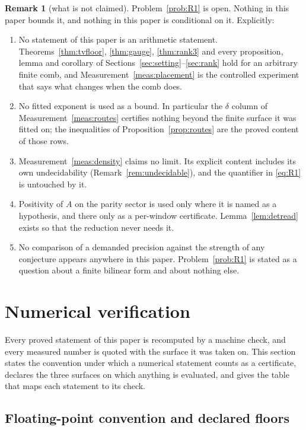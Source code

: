 \documentclass[11pt,a4paper]{article}
\theoremstyle{plain}
\theoremstyle{definition}
\newtheorem{remark}[theorem]{Remark}
\begin{document}
\begin{remark}[what is not claimed]
\label{rem:notclaimed}
Problem~\ref{prob:R1} is open. Nothing in this paper bounds it, and nothing in
this paper is conditional on it. Explicitly:
\begin{enumerate}[label=\textup{(\roman*)},leftmargin=2.6em]
\item No statement of this paper is an arithmetic statement.
  Theorems~\ref{thm:tvfloor}, \ref{thm:gauge}, \ref{thm:rank3} and every
  proposition, lemma and corollary of
  Sections~\ref{sec:setting}--\ref{sec:rank} hold for an arbitrary finite comb,
  and Measurement~\ref{meas:placement} is the controlled experiment that says
  what changes when the comb does.
\item No fitted exponent is used as a bound. In particular the $\delta$ column
  of Measurement~\ref{meas:routes} certifies nothing beyond the finite surface
  it was fitted on; the inequalities of Proposition~\ref{prop:routes} are the
  proved content of those rows.
\item Measurement~\ref{meas:density} claims no limit. Its explicit content
  includes its own undecidability (Remark~\ref{rem:undecidable}), and the
  quantifier in \eqref{eq:R1} is untouched by it.
\item Positivity of $A$ on the parity sector is used only where it is named as a
  hypothesis, and there only as a per-window certificate.
  Lemma~\ref{lem:detread} exists so that the reduction never needs it.
\item No comparison of a demanded precision against the strength of any
  conjecture appears anywhere in this paper. Problem~\ref{prob:R1} is stated as
  a question about a finite bilinear form and about nothing else.
\end{enumerate}
\end{remark}

\section{Numerical verification}
\label{sec:numerics}

Every proved statement of this paper is recomputed by a machine check, and every
measured number is quoted with the surface it was taken on. This
section states the convention under which a numerical statement counts as a
certificate, declares the three surfaces on which anything is evaluated, and
gives the table that maps each statement to its check.

\subsection{Floating-point convention and declared floors}
\label{sec:fp}
\end{document}

